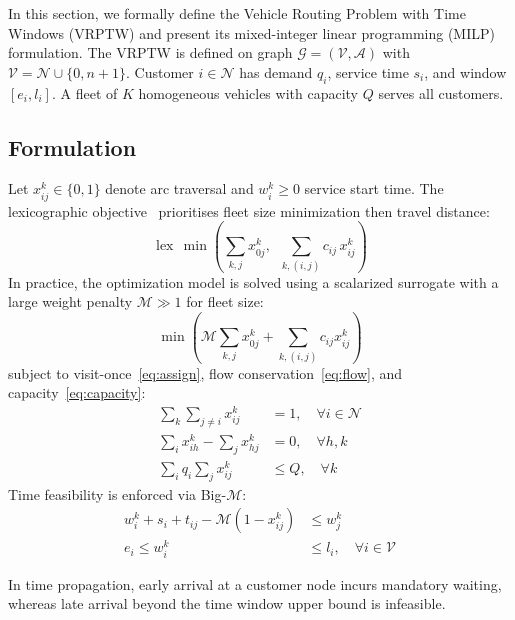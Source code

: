 \documentclass[journal]{IEEEtran}
\begin{document}
In this section, we formally define the Vehicle Routing Problem with Time Windows (VRPTW) and present its mixed-integer linear programming (MILP) formulation. The VRPTW is defined on graph $\mathcal{G}=(\mathcal{V},\mathcal{A})$ with
$\mathcal{V}=\mathcal{N}\cup\{0,n{+}1\}$.
Customer $i\in\mathcal{N}$ has demand $q_i$, service time $s_i$, and window
$[e_i,l_i]$.  A fleet of $K$ homogeneous vehicles with capacity $Q$ serves all
customers.

\subsection{Formulation}

Let $x_{ij}^k\in\{0,1\}$ denote arc traversal and $w_i^k\ge0$ service start
time.  The lexicographic objective~\cite{Solomon1987} prioritises fleet size minimization then travel distance:
\begin{equation}
  \operatorname{lex}\,\min \left( \sum_{k,j} x_{0j}^k, \;\; \sum_{k,(i,j)} c_{ij}\,x_{ij}^k \right)
  \label{eq:objective}
\end{equation}
In practice, the optimization model is solved using a scalarized surrogate with a large weight penalty $\mathcal{M} \gg 1$ for fleet size:
\begin{equation}
  \min\left(\mathcal{M}\sum_{k,j} x_{0j}^k + \sum_{k,(i,j)} c_{ij}x_{ij}^k\right)
\end{equation}
subject to visit-once~\eqref{eq:assign}, flow conservation~\eqref{eq:flow},
and capacity~\eqref{eq:capacity}:
\begin{align}
  \textstyle\sum_{k}\sum_{j\neq i}x_{ij}^k &=1,\quad\forall i\in\mathcal{N}
    \label{eq:assign}\\
  \textstyle\sum_{i}x_{ih}^k-\sum_{j}x_{hj}^k &=0,\quad\forall h,k
    \label{eq:flow}\\
  \textstyle\sum_{i}q_i\sum_{j}x_{ij}^k &\le Q,\quad\forall k
    \label{eq:capacity}
\end{align}
Time feasibility is enforced via Big-$\mathcal{M}$:
\begin{align}
  w_i^k+s_i+t_{ij}-\mathcal{M}(1-x_{ij}^k) &\le w_j^k \label{eq:bigM}\\
  e_i \le w_i^k &\le l_i,\quad\forall i\in\mathcal{V} \label{eq:tw}
\end{align}

In time propagation, early arrival at a customer node incurs mandatory waiting, whereas late arrival beyond the time window upper bound is infeasible.
\end{document}
